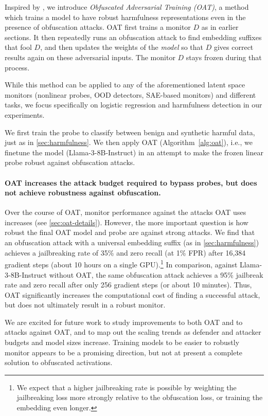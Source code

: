 \documentclass{article}
\begin{document}
Inspired by \cite{sheshadri2024targeted}, we introduce \emph{Obfuscated Adversarial Training (OAT)}, a method which trains a model to have robust harmfulness representations even in the presence of obfuscation attacks. 
OAT first trains a monitor $D$ as in earlier sections. It then repeatedly runs an obfuscation attack to find embedding suffixes that fool $D$, and then updates the weights of the \emph{model} so that $D$ gives correct results again on these adversarial inputs. The monitor $D$ stays frozen during that process.

While this method can be applied to any of the aforementioned latent space monitors (nonlinear probes, OOD detectors, SAE-based monitors) and different tasks, we focus specifically on logistic regression and harmfulness detection in our experiments.

We first train the probe to classify between benign and synthetic harmful data, just as in \cref{sec:harmfulness}. We then apply OAT (Algorithm~\ref{alg:oat}), i.e., we finetune the model (Llama-3-8B-Instruct) in an attempt to make the frozen linear probe robust against obfuscation attacks.


\paragraph{OAT increases the attack budget required to bypass probes, but does not achieve robustness against obfuscation.}
Over the course of OAT, monitor performance against the attacks OAT uses increases (see \cref{sec:oat-details}). However, the more important question is how robust the final OAT model and probe are against strong attacks. We find that an obfuscation attack with a universal embedding suffix (as in \cref{sec:harmfulness}) achieves a jailbreaking rate of 35\% and zero recall (at 1\% FPR) after 16,384 gradient steps (about 10 hours on a single GPU).\footnote{We expect that a higher jailbreaking rate is possible by weighting the jailbreaking loss more strongly relative to the obfuscation loss, or training the embedding even longer.} In comparison, against Llama-3-8B-Instruct without OAT, the same obfuscation attack achieves a 95\% jailbreak rate and zero recall after only 256 gradient steps (or about 10 minutes). Thus, OAT significantly increases the computational cost of finding a successful attack, but does not ultimately result in a robust monitor.


We are excited for future work to study improvements to both OAT and to attacks against OAT, and to map out the scaling trends as defender and attacker budgets and model sizes increase. Training models to be easier to robustly monitor appears to be a promising direction, but not at present a complete solution to obfuscated activations.
\end{document}
